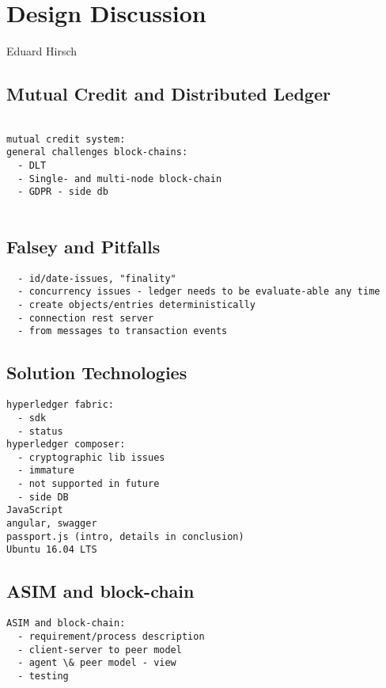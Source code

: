 \chapter{Design Discussion}
\label{ch:design}

\vspace{-1cm}
\begin{center}
Eduard Hirsch
\end{center}

\section{Mutual Credit and Distributed Ledger}
\label{sec:dlt}

\begin{verbatim}

mutual credit system:
general challenges block-chains:
  - DLT
  - Single- and multi-node block-chain
  - GDPR - side db
  
\end{verbatim}
  
\section{Falsey and Pitfalls}

\begin{verbatim}
  - id/date-issues, "finality"
  - concurrency issues - ledger needs to be evaluate-able any time
  - create objects/entries deterministically
  - connection rest server
  - from messages to transaction events
\end{verbatim}

\section{Solution Technologies}
\label{sec:solution}

\begin{verbatim}
hyperledger fabric:
  - sdk
  - status
hyperledger composer:
  - cryptographic lib issues
  - immature
  - not supported in future
  - side DB
JavaScript
angular, swagger
passport.js (intro, details in conclusion)
Ubuntu 16.04 LTS
\end{verbatim}


\section{ASIM and block-chain}
\label{sec:asim}

\begin{verbatim}
ASIM and block-chain:
  - requirement/process description
  - client-server to peer model
  - agent \& peer model - view 
  - testing
\end{verbatim}